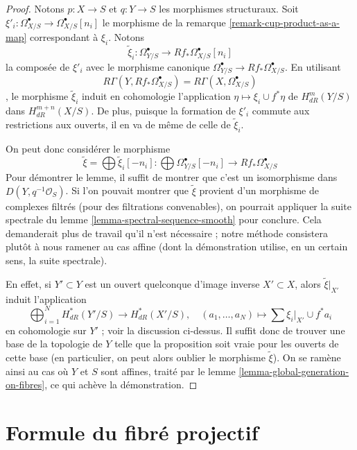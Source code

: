 \begin{proof}
Notons $p : X \to S$ et $q : Y \to S$ les morphismes structuraux.
Soit $\xi'_i : \Omega^\bullet_{X/S} \to \Omega^\bullet_{X/S}[n_i]$
le morphisme de la remarque \ref{remark-cup-product-as-a-map} correspondant
à $\xi_i$. Notons
$$
\tilde \xi_i :
\Omega^\bullet_{Y/S} \to Rf_*\Omega^\bullet_{X/S}[n_i]
$$
la composée de $\xi'_i$ avec le morphisme canonique
$\Omega^\bullet_{Y/S} \to Rf_*\Omega^\bullet_{X/S}$.
En utilisant
$$
R\Gamma(Y, Rf_*\Omega^\bullet_{X/S}) = R\Gamma(X, \Omega^\bullet_{X/S})
$$,
le morphisme $\tilde \xi_i$ induit en cohomologie l'application $\eta \mapsto \xi_i \cup f^*\eta$
de $H^m_{dR}(Y/S)$ dans $H^{m + n}_{dR}(X/S)$.
De plus, puisque la formation de $\xi'_i$ commute aux
restrictions aux ouverts, il en va de même de celle de $\tilde \xi_i$.

\medskip\noindent
On peut donc considérer le morphisme
$$
\tilde \xi = \bigoplus \tilde \xi_i[-n_i] :
\bigoplus \Omega^\bullet_{Y/S}[-n_i]
\longrightarrow
Rf_*\Omega^\bullet_{X/S}
$$
Pour démontrer le lemme, il suffit de montrer que c'est un isomorphisme dans
$D(Y, q^{-1}\mathcal{O}_S)$. Si l'on pouvait montrer que $\tilde \xi$
provient d'un morphisme de complexes filtrés (pour des filtrations convenables),
on pourrait appliquer la suite spectrale du
lemme \ref{lemma-spectral-sequence-smooth} pour conclure.
Cela demanderait plus de travail qu'il n'est nécessaire ; notre méthode
consistera plutôt à nous ramener au cas affine (dont la démonstration utilise,
en un certain sens, la suite spectrale).

\medskip\noindent
En effet, si $Y' \subset Y$ est un ouvert quelconque d'image inverse
$X' \subset X$, alors $\tilde \xi|_{X'}$ induit l'application
$$
\bigoplus\nolimits_{i = 1}^N H^*_{dR}(Y'/S) \longrightarrow
H^*_{dR}(X'/S), \quad
(a_1, \ldots, a_N) \longmapsto  \sum \xi_i|_{X'} \cup f^*a_i
$$
en cohomologie sur $Y'$ ; voir la discussion ci-dessus.
Il suffit donc de trouver une base de la topologie
de $Y$ telle que la proposition soit vraie pour les ouverts de cette base
(en particulier, on peut alors oublier le morphisme $\tilde \xi$).
On se ramène ainsi au cas où $Y$ et $S$
sont affines, traité par le lemme \ref{lemma-global-generation-on-fibres},
ce qui achève la démonstration.
\end{proof}





\section{Formule du fibré projectif}
\label{section-projective-space-bundle-formula}

